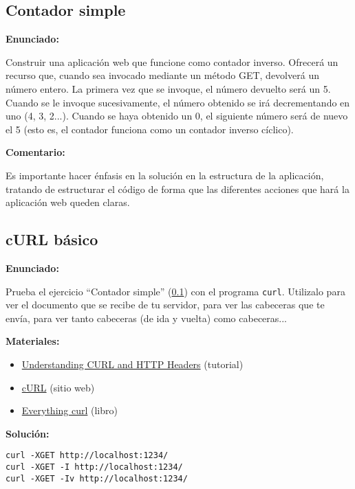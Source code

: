 \subsection{Contador simple}
\label{subsec:contador-simple}

\textbf{Enunciado:}

Construir una aplicación web que funcione como contador inverso. Ofrecerá un recurso que, cuando sea invocado mediante un método GET, devolverá un número entero. La primera vez que se invoque, el número devuelto será un 5. Cuando se le invoque sucesivamente, el número obtenido se irá decrementando en uno (4, 3, 2...). Cuando se haya obtenido un 0, el siguiente número será de nuevo el 5 (esto es, el contador funciona como un contador inverso cíclico).

\textbf{Comentario:}

Es importante hacer énfasis en la solución en la estructura de la aplicación, tratando de estructurar el código de forma que las diferentes acciones que hará la aplicación web queden claras.

\subsection{cURL básico}
\label{subsec:curl-basico}

\textbf{Enunciado:}

Prueba el ejercicio ``Contador simple'' (\ref{subsec:contador-simple}) con el programa \verb|curl|. Utilizalo para ver el documento que se recibe de tu servidor, para ver las cabeceras que te envía, para ver tanto cabeceras (de ida y vuelta) como cabeceras...

\textbf{Materiales:}

\begin{itemize}
\item \href{https://linuxacademy.com/guide/13852-understanding-curl-and-http-headers/}{Understanding CURL and HTTP Headers} (tutorial)
\item \href{https://curl.haxx.se/}{cURL} (sitio web)
\item \href{https://curl.haxx.se/book.html}{Everything curl} (libro)
\end{itemize}

\textbf{Solución:}

\begin{verbatim}
curl -XGET http://localhost:1234/
curl -XGET -I http://localhost:1234/
curl -XGET -Iv http://localhost:1234/
\end{verbatim}

